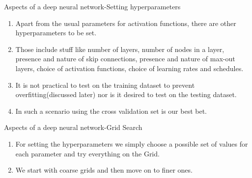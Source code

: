 \begin{frame}{Aspects of a deep neural network-Setting hyperparameters}
	\begin{enumerate}[$\bullet$]
		\item Apart from the usual parameters for activation functions, there are other hyperparameters to be set.\pause
		\item Those include stuff like number of layers, number of nodes in a layer, presence and nature of skip connections, presence and nature of max-out layers, choice of activation  functions, choice of learning rates and schedules.\pause
		\item It is not practical to test on the training dataset to prevent overfitting(discussed later) nor is it desired to test on the testing dataset. \pause
		\item In such a scenario using the cross validation set is our best bet.
	\end{enumerate}
\end{frame}

\begin{frame}{Aspects of a deep neural network-Grid Search}
	\begin{enumerate}[$\bullet$]
		\item For setting the hyperparameters we simply choose a possible set of values for each parameter and try everything on the Grid.\pause
		\item We start with coarse grids and then move on to finer ones.
	\end{enumerate}
\end{frame}

